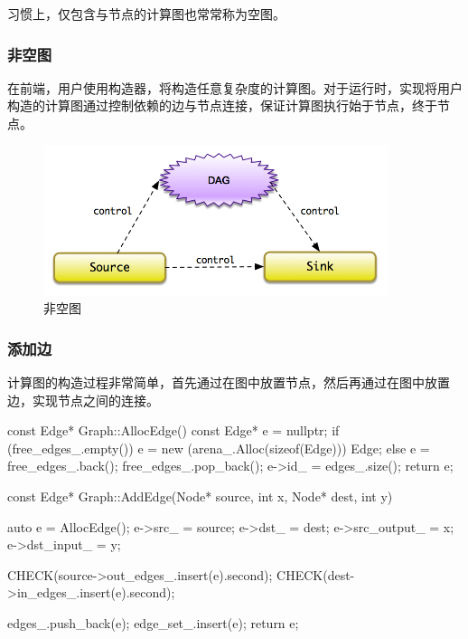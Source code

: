 \begin{content}
习惯上，仅包含与节点的计算图也常常称为空图。

\subsubsection{非空图}

在前端，用户使用构造器，将构造任意复杂度的计算图。对于运行时，实现将用户构造的计算图通过控制依赖的边与节点连接，保证计算图执行始于节点，终于节点。

\begin{figure}[!htbp]
\centering
\includegraphics[width=0.9\textwidth]{figures/cc-non-empty-graph.png}
\caption{非空图}
 \label{fig:cc-non-empty-graph}
\end{figure}

\subsubsection{添加边}

计算图的构造过程非常简单，首先通过在图中放置节点，然后再通过在图中放置边，实现节点之间的连接。

\begin{leftbar}
\begin{c++}
const Edge* Graph::AllocEdge() const {
  Edge* e = nullptr;
  if (free_edges_.empty()) {
    e = new (arena_.Alloc(sizeof(Edge))) Edge;
  } else {
    e = free_edges_.back();
    free_edges_.pop_back();
  }
  e->id_ = edges_.size();
  return e;
}

const Edge* Graph::AddEdge(Node* source, int x, Node* dest, int y) {
  auto e = AllocEdge();
  e->src_ = source;
  e->dst_ = dest;
  e->src_output_ = x;
  e->dst_input_ = y;

  CHECK(source->out_edges_.insert(e).second);
  CHECK(dest->in_edges_.insert(e).second);

  edges_.push_back(e);
  edge_set_.insert(e);
  return e;
}
\end{c++}
\end{leftbar}


\end{content}
